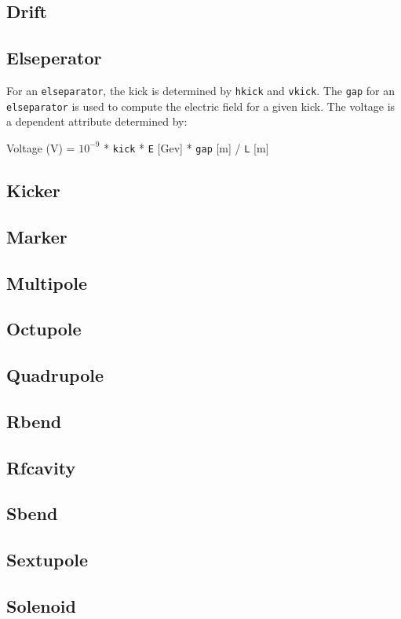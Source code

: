 \subsection{Drift}
\subsection{Elseperator}
For an {\tt elseparator}, the kick is determined by {\tt hkick} and {\tt vkick}. The {\tt gap} for an
{\tt elseparator} is used to compute the electric field for a given kick. The voltage is a dependent
attribute determined by:

Voltage (V) = $10^{-9}$ * {\tt kick} * {\tt E} [Gev] * {\tt gap} [m] / {\tt L} [m] 

\subsection{Kicker}
\subsection{Marker}
\subsection{Multipole}
\subsection{Octupole}
\subsection{Quadrupole}
\subsection{Rbend}
\subsection{Rfcavity}
\subsection{Sbend}
\subsection{Sextupole}
\subsection{Solenoid}

